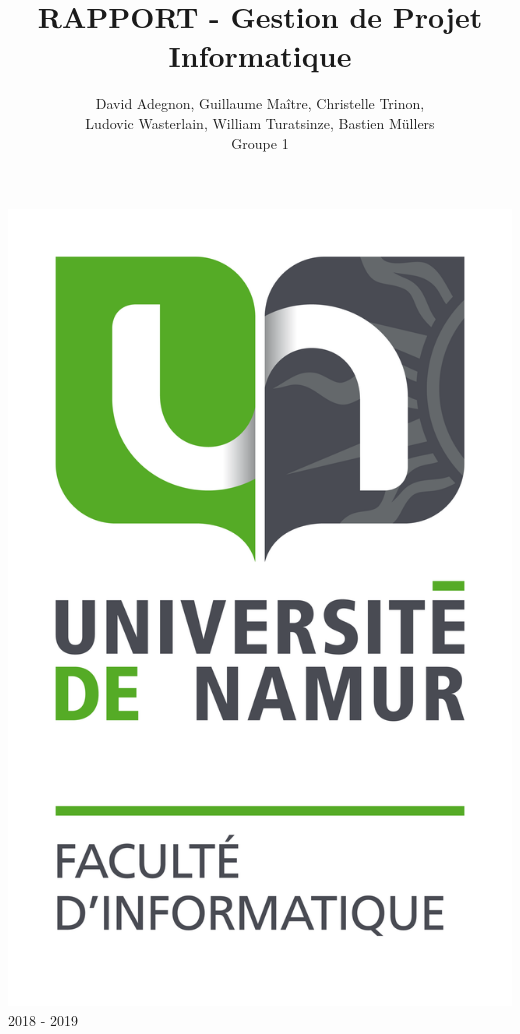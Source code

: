 \documentclass[t, 12pt, usenames,dvipsnames]{article}
\title{RAPPORT - Gestion de Projet Informatique}
\author{David Adegnon, Guillaume Maître, Christelle Trinon,\\Ludovic Wasterlain, William Turatsinze, Bastien Müllers\\Groupe 1}
\begin{document}
    \begin{titlepage}
        \maketitle
        
        \begin{center}
            \includegraphics[scale=0.5]{images/FAC_info.png} \\
            2018 - 2019
        \end{center}
    
    \end{titlepage}

    
\end{document}
